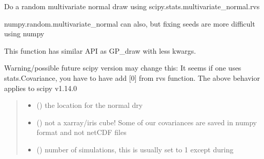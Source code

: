 \documentclass[letterpaper,10pt,english]{sphinxmanual}
\begin{document}

\begin{fulllineitems}
\label{\detokenize{kriging:glomar_gridding.stochastic.scipy_mv_normal_draw}}
\pysigstartsignatures
\pysiglinewithargsret
{}
{\sphinxparamcomma {}\sphinxparamcomma {}\sphinxparamcomma {}\sphinxparamcomma {}}
{}
\pysigstopsignatures
\sphinxAtStartPar
Do a random multivariate normal draw using
scipy.stats.multivariate\_normal.rvs

\sphinxAtStartPar
numpy.random.multivariate\_normal can also,
but fixing seeds are more difficult using numpy

\sphinxAtStartPar
This function has similar API as GP\_draw with less kwargs.

\sphinxAtStartPar
Warning/possible future scipy version may change this:
It seems if one uses stats.Covariance, you have to have add {[}0{]} from rvs
function. The above behavior applies to scipy v1.14.0
\begin{quote}\begin{description}
\begin{itemize}
\item {}
\sphinxAtStartPar
{} () \textendash{} the location for the normal dry

\item {}
\sphinxAtStartPar
{} () \textendash{} not a xarray/iris cube! Some of our covariances are saved in numpy
format and not netCDF files

\item {}
\sphinxAtStartPar
{} () \textendash{} number of simulations, this is usually set to 1 except during


\end{itemize}
\end{description}
\end{quote}
\end{fulllineitems}
\end{document}

